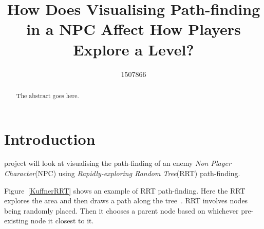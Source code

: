 \documentclass[journal]{IEEEtran}
\begin{document}
%
\title{ How Does Visualising Path-finding in a NPC Affect How Players Explore a Level?}
%
%
\author{1507866}


\maketitle

\begin{abstract}
The abstract goes here.
\end{abstract}

\section{Introduction}
% 
% 
% 
% 
 project will look at visualising the path-finding of an enemy \textit{Non Player Character}(NPC) using \textit{Rapidly-exploring Random Tree}(RRT) path-finding.   

Figure~\ref{KuffnerRRT} shows an example of RRT path-finding. Here the RRT explores the area and then draws a path along the tree~\cite{Kuffner2000}.  RRT involves nodes being randomly placed. Then it chooses a parent node based on whichever pre-existing node it closest to it.
\end{document}
